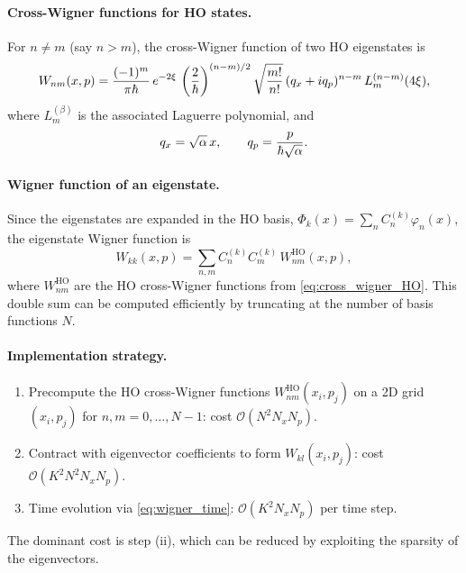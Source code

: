 \paragraph{Cross-Wigner functions for HO states.}

For $n \neq m$ (say $n > m$), the cross-Wigner function of two HO eigenstates is
\begin{equation}\label{eq:cross_wigner_HO}
  W_{nm}(x,p) = \frac{(-1)^m}{\pi\hbar}\,e^{-2\xi}\,\left(\frac{2}{\hbar}\right)^{(n-m)/2}
  \sqrt{\frac{m!}{n!}}\,(q_x + iq_p)^{n-m}\,L_m^{(n-m)}(4\xi),
\end{equation}
where $L_m^{(\beta)}$ is the associated Laguerre polynomial, and
\begin{equation}
  q_x = \sqrt{\alpha}\,x, \qquad q_p = \frac{p}{\hbar\sqrt{\alpha}}.
\end{equation}

\paragraph{Wigner function of an eigenstate.}

Since the eigenstates are expanded in the HO basis, $\Phi_k(x) = \sum_n C_n^{(k)}\varphi_n(x)$, the eigenstate Wigner function is
\begin{equation}\label{eq:wigner_eigenstate}
  W_{kk}(x,p) = \sum_{n,m} C_n^{(k)} C_m^{(k)}\,W_{nm}^{\text{HO}}(x,p),
\end{equation}
where $W_{nm}^{\text{HO}}$ are the HO cross-Wigner functions from \cref{eq:cross_wigner_HO}.
This double sum can be computed efficiently by truncating at the number of basis functions $N$.

\paragraph{Implementation strategy.}

\begin{enumerate}[label=(\roman*)]
  \item Precompute the HO cross-Wigner functions $W_{nm}^{\text{HO}}(x_i,p_j)$ on a 2D grid $(x_i,p_j)$ for $n,m = 0,\ldots,N-1$: cost $\mathcal{O}(N^2 N_x N_p)$.
  \item Contract with eigenvector coefficients to form $W_{kl}(x_i,p_j)$: cost $\mathcal{O}(K^2 N^2 N_x N_p)$.
  \item Time evolution via \cref{eq:wigner_time}: $\mathcal{O}(K^2 N_x N_p)$ per time step.
\end{enumerate}
The dominant cost is step (ii), which can be reduced by exploiting the sparsity of the eigenvectors.

